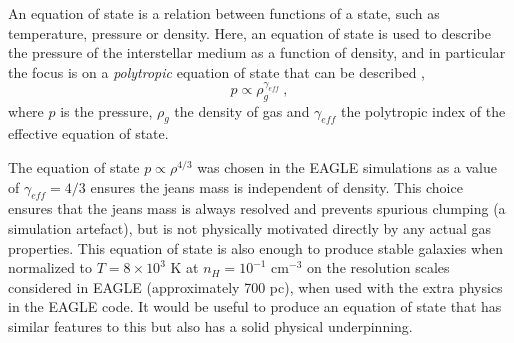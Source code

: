 An equation of state is a relation between functions of a state, such as temperature, pressure or density. 
Here, an equation of state is used to describe the pressure of the interstellar medium as a function of density, and in particular the focus is on a \emph{polytropic} equation of state that can be described \citep{horedt_polytropes:_2004},
\begin{equation}
\label{eqn:polytrope}
p \propto \rho_g ^ {\gamma_{eff}}~,
\end{equation}
where $p$ is the pressure, $\rho_g$ the density of gas and $\gamma_{eff}$ the polytropic index of the effective equation of state.

The equation of state $p \propto \rho^{4/3}$ was chosen in the EAGLE simulations \citep{schaye_eagle_2015} as a value of $\gamma_{eff} = 4/3$ ensures the jeans mass is independent of density.
This choice ensures that the jeans mass is always resolved and prevents spurious clumping (a simulation artefact), but is not physically motivated directly by any actual gas properties.
This equation of state is also enough to produce stable galaxies when normalized to $T = 8\times 10^3$ K at $n_H = 10^{-1}$ cm$^{-3}$ on the resolution scales considered in EAGLE (approximately 700 pc), when used with the extra physics in the EAGLE code.
It would be useful to produce an equation of state that has similar features to this but also has a solid physical underpinning.

